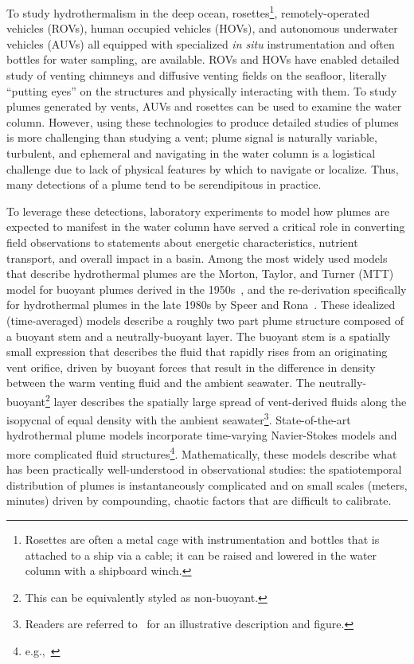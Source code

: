To study hydrothermalism in the deep ocean, rosettes\footnote{Rosettes are often a metal cage with instrumentation and bottles that is attached to a ship via a cable; it can be raised and lowered in the water column with a shipboard winch.}, remotely-operated vehicles (ROVs), human occupied vehicles (HOVs), and autonomous underwater vehicles (AUVs) all equipped with specialized \emph{in situ} instrumentation and often bottles for water sampling, are available.
ROVs and HOVs have enabled detailed study of venting chimneys and diffusive venting fields on the seafloor, literally ``putting eyes'' on the structures and physically interacting with them.
To study plumes generated by vents, AUVs and rosettes can be used to examine the water column.
However, using these technologies to produce detailed studies of plumes is more challenging than studying a vent; plume signal is naturally variable, turbulent, and ephemeral and navigating in the water column is a logistical challenge due to lack of physical features by which to navigate or localize. 
Thus, many detections of a plume tend to be serendipitous in practice.

To leverage these detections, laboratory experiments to model how plumes are expected to manifest in the water column have served a critical role in converting field observations to statements about energetic characteristics, nutrient transport, and overall impact in a basin.
Among the most widely used models that describe hydrothermal plumes are the Morton, Taylor, and Turner (MTT) model for buoyant plumes derived in the 1950s~\autocite{morton1956turbulent}, and the re-derivation specifically for hydrothermal plumes in the late 1980s by Speer and Rona~\autocite{speer1989model}.
These idealized (time-averaged) models describe a roughly two part plume structure composed of a buoyant stem and a neutrally-buoyant layer. 
The buoyant stem is a spatially small expression that describes the fluid that rapidly rises from an originating vent orifice, driven by buoyant forces that result in the difference in density between the warm venting fluid and the ambient seawater.
The neutrally-buoyant\footnote{This can be equivalently styled as non-buoyant.} layer describes the spatially large spread of vent-derived fluids along the isopycnal of equal density with the ambient seawater\footnote{Readers are referred to~\autocite{yoerger2007autonomous} for an illustrative description and figure.}. 
State-of-the-art hydrothermal plume models incorporate time-varying Navier-Stokes models and more complicated fluid structures\footnote{e.g.,~\autocite{lavelle2013turbulent,xu2012deep}}.
Mathematically, these models describe what has been practically well-understood in observational studies: the spatiotemporal distribution of plumes is instantaneously complicated and on small scales (meters, minutes) driven by compounding, chaotic factors that are difficult to calibrate.



